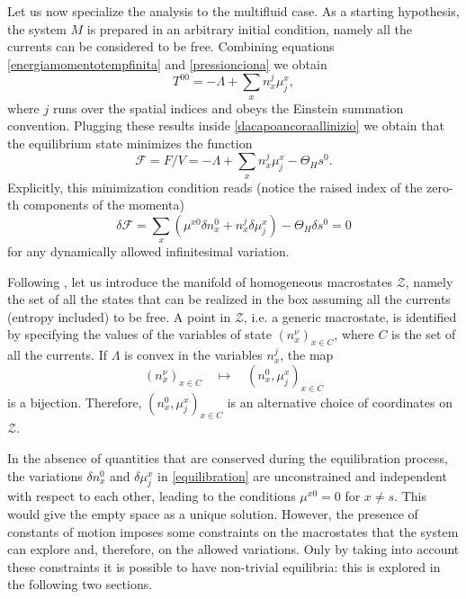 \documentclass[usenatbib]{mnras}
\begin{document}
Let us now specialize the analysis to the multifluid case. As a starting hypothesis, the system $M$ is prepared in an arbitrary initial condition, namely all the currents can be considered to be free. Combining equations \eqref{energiamomentotempfinita} and \eqref{pressionciona} we obtain
%
\begin{equation}
T^{00} = -\Lambda + \sum_x n_x^j \mu^x_j ,
\end{equation}
%
where $j$ runs over the spatial indices and obeys the Einstein summation convention. Plugging these results inside \eqref{dacapoancoraallinizio} we obtain that the equilibrium state minimizes the function
%
\begin{equation}\label{energialiberallinizio}
\mathcal{F} = F/V  = -\Lambda + \sum_x n_x^j \mu^x_j -\Theta_H s^0.
\end{equation}
%
Explicitly, this minimization condition reads (notice the raised index of the zero-th components of the momenta)
%
\begin{equation}
\label{equilibration}
\delta \mathcal{F} = \sum_x (\mu^{x0}\delta n_x^0 + n_x^j \delta \mu_{j}^x) - \Theta_H \delta s^0 =0
\end{equation}
%
for any dynamically allowed infinitesimal variation. 

Following \cite{Callen_book}, let us introduce the manifold of homogeneous macrostates $\mathcal{Z}$, namely the set of all the states that can be realized in the box assuming all the currents (entropy included) to be free. A point in  $\mathcal{Z}$, i.e. a generic macrostate, is identified by specifying the values of the variables of state $(n_x^\nu)_{x \in C} $, where $C$ is the set of all the currents. If $\Lambda$ is convex in the variables $n_x^j$, the map
%
\begin{equation}
\label{biezione}
(n_x^\nu)_{x \in C}  \quad \longmapsto \quad (n_x^0,\mu^x_j)_{x \in C} 
\end{equation}
%
is a bijection. Therefore,  $(n_x^0,\mu^x_j)_{x \in C} $ is an alternative choice of coordinates on  $\mathcal{Z}$.

In the absence of quantities that are conserved during the equilibration process, the variations $\delta n_x^0$ and $\delta \mu^x_j$ in \eqref{equilibration} are unconstrained and independent with respect to each other, leading to the conditions $\mu^{x0}=0$ for $ x \neq s$. This would give the empty space as a unique solution. However, the presence of constants of motion imposes some constraints on the macrostates that the system can explore and, therefore, on the allowed variations. Only by taking into account these constraints it is possible to have non-trivial equilibria: this is explored in the following two sections. 
\end{document}
